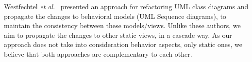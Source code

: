 






Westfechtel \textit{et al}.~\cite{ICSOFT2014_Winetzhammer} presented an approach for refactoring UML class diagrams and propagate the changes to behavioral models (UML Sequence diagrams), to maintain the consistency between these models/views. Unlike these authors, we aim to propagate the changes to other static views, in a cascade way. %
As our approach does not take into consideration behavior aspects, only static ones, we believe that both approaches are complementary to each other.

